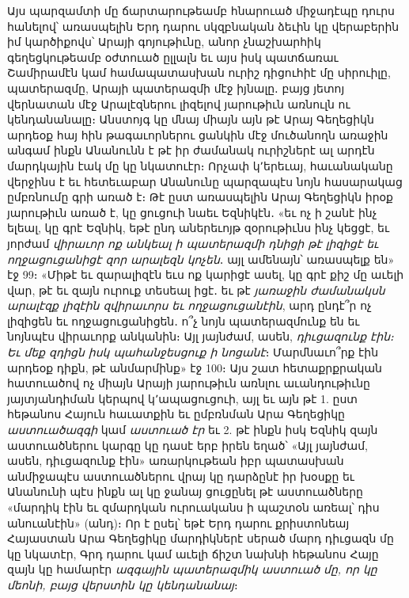 \documentclass{article}
\begin{document}
{Այս պարզամտի մը ճարտարութեամբ հնարուած միջադէպը դուրս հանելով՝ առասպելին Երդ դարու սկզբնական ձեւին կը վերաբերին իմ կարծիքովս՝ Արայի գոյութիւնը, անոր չնաշխարհիկ գեղեցկութեամբ օժտուած ըլլալն եւ այս իսկ պատճառաւ Շամիրամէն կամ համապատասխան ուրիշ դիցուհիէ մը սիրուիլը, պատերազմը, Արայի պատերազմի մէջ իյնալը․ բայց յետոյ վերնատան մէջ Արալէզներու լիզելով յարութիւն առնուլն ու կենդանանալը։ Անստոյգ կը մնայ միայն այն թէ Արայ Գեղեցիկն արդեօք հայ հին թագաւորներու ցանկին մէջ մուծանողն առաջին անգամ ինքն Անանունն է թէ իր ժամանակ ուրիշներէ ալ արդէն մարդկային էակ մը կը նկատուէր։ Որչափ կ՚երեւայ, հաւանականը վերջինս է եւ հետեւաբար Անանունը պարզապէս նոյն հասարակաց ըմբռնումը գրի առած է։ Թէ ըստ առասպելին Արայ Գեղեցիկն իրօք յարութիւն առած է, կը ցուցուի նաեւ Եզնիկէն․ «եւ ոչ ի շանէ ինչ ելեալ, կը գրէ Եզնիկ, եթէ ընդ աներեւոյթ զօրութիւնս ինչ կեցցէ, եւ յորժամ \emph{վիրաւոր ոք անկեալ ի պատերազմի դնիցի թէ լիզիցէ եւ ողջացուցանիցէ զոր արալեզն կոչեն}․ այլ ամենայն՝ առասպելք են» էջ 99։ «Միթէ եւ զարալիզէն եւս ոք կարիցէ ասել, կը գրէ քիշ մը աւելի վար, թէ եւ զայն ուրուք տեսեալ իցէ․ եւ թէ \emph{յառաջին ժամանակսն արալէզք լիզէին զվիրաւորս եւ ողջացուցանէին}, արդ ընդէ՞ր ոչ լիզիցեն եւ ողջացուցանիցեն․ ո՞չ նոյն պատերազմունք են եւ նոյնպէս վիրաւորք անկանին։ Այլ յայնժամ, ասեն, \emph{դիւցազունք էին։ Եւ մեք զդիցն իսկ պահանջեսցուք ի նոցանէ}։ Մարմնաւո՞րք էին արդեօք դիքն, թէ անմարմինք» էջ 100։ Այս շատ հետաքրքրական հատուածով ոչ միայն Արայի յարութիւն առնլու աւանդութիւնը յայտյանդիման կերպով կ՚ապացուցուի, այլ եւ այն թէ 1. ըստ հեթանոս Հայուն հաւատքին եւ ըմբռնման Արա Գեղեցիկը \emph{աստուածազգի} կամ \emph{աստուած էր} եւ 2. թէ ինքն իսկ Եզնիկ զայն աստուածներու կարգը կը դասէ երբ իրեն եղած՝ «Այլ յայնժամ, ասեն, դիւցազունք էին» առարկութեան իբր պատասխան անմիջապէս աստուածներու վրայ կը դարձընէ իր խօսքը եւ Անանունի պէս ինքն ալ կը ջանայ ցուցընել թէ աստուածները «մարդիկ էին եւ զմարդկան ուրուականս ի պաշտօն առեալ՝ դիս անուանէին» (անդ)։ Որ է ըսել՝ եթէ Երդ դարու քրիստոնեայ Հայաստան Արա Գեղեցիկը մարդիկներէ սերած մարդ դիւցազն մը կը նկատէր, Գրդ դարու կամ աւելի ճիշտ նախնի հեթանոս Հայը զայն կը համարէր \emph{ազգային պատերազմիկ աստուած մը, որ կը մեոնի, բայց վերստին կը կենդանանայ}։}
\clearpage
\subsection{}
\end{document}
